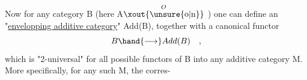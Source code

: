 Now for any category B (here A$\overset{O}{\text{\xout{\unsure{o|n}}}}$ )
one can define an "\uline{envelopping additive category}"  Add(B),  together
with a canonical functor
 \[ B \hand{\longrightarrow} Add(B) \quad , \]
which  is "2-universal"  for all possible functors of B into any
additive category M.  More specifically,  for any such M,  the corres-%



